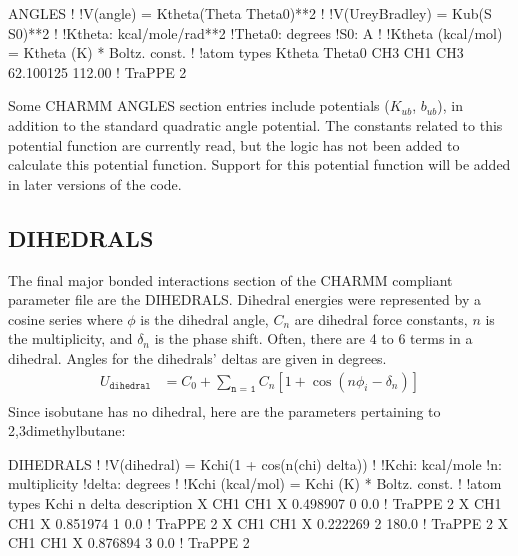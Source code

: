 \documentclass[letterpaper,10pt,english]{sphinxmanual}
\begin{document}
\begin{sphinxVerbatim}[commandchars=\\\{\}]
ANGLES
!
!V(angle) = Ktheta(Theta \PYGZhy{} Theta0)**2
!
!V(Urey\PYGZhy{}Bradley) = Kub(S \PYGZhy{} S0)**2
!
!Ktheta:  kcal/mole/rad**2
!Theta0:  degrees
!S0:  A
!
!Ktheta (kcal/mol) = Ktheta (K) * Boltz.  const.
!
!atom types         Ktheta        Theta0
CH3   CH1   CH3     62.100125     112.00 !  TraPPE 2
\end{sphinxVerbatim}

Some CHARMM ANGLES section entries include  potentials (\(K_{ub}\), \(b_{ub}\)), in addition to the standard quadratic angle potential. The constants related to this potential function are currently read, but the logic has not been added to calculate this potential function. Support for this potential function will be added in later versions of the code.


\subsection{DIHEDRALS}
\label{\detokenize{input_file:dihedrals}}
The final major bonded interactions section of the CHARMM compliant parameter file are the DIHEDRALS. Dihedral energies were represented by a cosine series where \(\phi\) is the dihedral angle, \(C_n\) are dihedral force constants, \(n\) is the multiplicity, and \(\delta_n\) is the phase shift.
Often, there are 4 to 6 terms in a dihedral. Angles for the dihedrals’ deltas are given in degrees.
\begin{equation*}
\begin{split}U_{\texttt{dihedral}}&= C_0 + \sum_{\texttt{n = 1}} C_n [1+\cos(n\phi_i - \delta_n)]\\\end{split}
\end{equation*}
Since isobutane has no dihedral, here are the parameters pertaining to 2,3\sphinxhyphen{}dimethylbutane:

\begin{sphinxVerbatim}[commandchars=\\\{\}]
DIHEDRALS
!
!V(dihedral) = Kchi(1 + cos(n(chi) \PYGZhy{} delta))
!
!Kchi:  kcal/mole
!n:  multiplicity
!delta:  degrees
!
!Kchi (kcal/mol) = Kchi (K) * Boltz.  const.
!
!atom types             Kchi    n     delta   description
X   CH1   CH1   X    \PYGZhy{}0.498907  0     0.0   !  TraPPE 2
X   CH1   CH1   X     0.851974  1     0.0   !  TraPPE 2
X   CH1   CH1   X    \PYGZhy{}0.222269  2   180.0   !  TraPPE 2
X   CH1   CH1   X     0.876894  3     0.0   !  TraPPE 2
\end{sphinxVerbatim}
\end{document}
